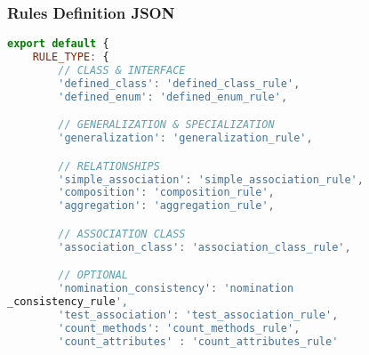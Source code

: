 \subsubsection{Rules Definition JSON}
\begin{lstlisting}[caption={Rules Definition JSON}, label={lst:rules_def}, language=javascript]
export default {
    RULE_TYPE: {
        // CLASS & INTERFACE
        'defined_class': 'defined_class_rule',
        'defined_enum': 'defined_enum_rule',

        // GENERALIZATION & SPECIALIZATION
        'generalization': 'generalization_rule',

        // RELATIONSHIPS
        'simple_association': 'simple_association_rule',
        'composition': 'composition_rule',
        'aggregation': 'aggregation_rule',

        // ASSOCIATION CLASS
        'association_class': 'association_class_rule',

        // OPTIONAL
        'nomination_consistency': 'nomination
_consistency_rule',
        'test_association': 'test_association_rule',
        'count_methods': 'count_methods_rule',
        'count_attributes' : 'count_attributes_rule'


\end{lstlisting}

